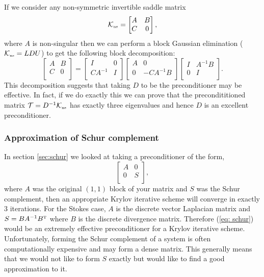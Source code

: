 \documentclass[11pt]{article}
\numberwithin{equation}{section}    %
\begin{document}
If we consider any non-symmetric invertible saddle matrix
$$\mathcal{K}_{\mbox{\tiny{ns}}} = \begin{bmatrix}
A & B\\
C & 0\\
\end{bmatrix}, $$
where $A$ is non-singular then we can perform a block Gaussian elimination ($\mathcal{K}_{\mbox{\tiny{ns}}}  = LDU$) to get the following block decomposition:
$$\begin{bmatrix}
A & B\\
C & 0\\
\end{bmatrix}=
\begin{bmatrix}
I& 0\\
CA^{-1}& I\\
\end{bmatrix}
\begin{bmatrix}
A& 0\\
0& -CA^{-1}B\\
\end{bmatrix}
\begin{bmatrix}
I & A^{-1}B\\
0& I\\
\end{bmatrix}.$$
This decomposition suggests that taking $D$ to be the preconditioner may be effective. In fact, if we do exactly this we can prove \cite{Murphy2000} that the precondititioned matrix $\mathcal{T} =D^{-1} \mathcal{K}_{\mbox{\tiny{ns}}} $ has exactly three eigenvalues and hence $D$ is an excellent preconditioner.

\subsubsection{Approximation of Schur complement} \label{sec:schurapprox}

In section \ref{sec:schur} we looked at taking a preconditioner of the form,
\begin{equation} \label{eq: schur}
    \begin{bmatrix}
    A & 0\\
    0 & S\\
    \end{bmatrix},
\end{equation}
where $A$ was the original $(1,1)$ block of your matrix and $S$ was the Schur complement, then an appropriate Krylov iterative scheme will converge in exactly $3$ iterations.  For the Stokes case, $A$ is the discrete vector Laplacian matrix  and $S = BA^{-1}B^{\mbox{\tiny{T}}}$ where $B$ is the discrete divergence matrix. Therefore (\ref{eq: schur}) would be an extremely effective preconditioner for a Krylov iterative scheme. Unfortunately, forming the Schur complement of a system is often computationally expensive and may form a dense matrix. This generally means that we would not like to form $S$ exactly but would like to find a good approximation to it.
\end{document}
